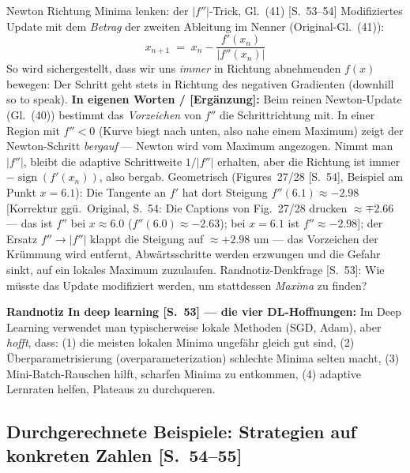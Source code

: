 \begin{satzbox}{Newton Richtung Minima lenken: der $|f''|$-Trick, Gl.~(41) [S.~53--54]}
Modifiziertes Update mit dem \emph{Betrag} der zweiten Ableitung im Nenner
(Original-Gl.~(41)):
\[
  x_{n+1} \;=\; x_n - \frac{f'(x_n)}{\bigl|f''(x_n)\bigr|} \tag{41}
\]
So wird sichergestellt, dass wir uns \emph{immer} in Richtung abnehmenden $f(x)$
bewegen: Der Schritt geht stets in Richtung des negativen Gradienten
(\glqq downhill so to speak\grqq).
\textbf{In eigenen Worten / [Ergänzung]:} Beim reinen Newton-Update (Gl.~(40))
bestimmt das \emph{Vorzeichen} von $f''$ die Schrittrichtung mit. In einer Region mit
$f'' < 0$ (Kurve biegt nach unten, also nahe einem Maximum) zeigt der Newton-Schritt
\emph{bergauf} --- Newton wird vom Maximum angezogen. Nimmt man $|f''|$, bleibt die
adaptive Schrittweite $1/|f''|$ erhalten, aber die Richtung ist immer
$-\operatorname{sign}(f'(x_n))$, also bergab. Geometrisch (Figures~27/28 [S.~54],
Beispiel am Punkt $x = 6.1$): Die Tangente an $f'$ hat dort Steigung $f''(6.1) \approx -2.98$
[Korrektur ggü.\ Original, S.~54: Die Captions von Fig.~27/28 drucken $\approx \mp 2.66$ ---
das ist $f''$ bei $x \approx 6.0$ ($f''(6.0) \approx -2.63$); bei $x = 6.1$ ist
$f'' \approx -2.98$]; der Ersatz $f'' \to |f''|$ klappt die Steigung auf $\approx +2.98$ um --- das
Vorzeichen der Krümmung wird entfernt, Abwärtsschritte werden erzwungen und die Gefahr
sinkt, auf ein lokales Maximum zuzulaufen. Randnotiz-Denkfrage [S.~53]: Wie müsste das
Update modifiziert werden, um stattdessen \emph{Maxima} zu finden?

\medskip
\textbf{Randnotiz \glqq In deep learning\grqq{} [S.~53] --- die vier DL-Hoffnungen:}
Im Deep Learning verwendet man typischerweise lokale Methoden (SGD, Adam), aber
\emph{hofft}, dass: (1) die meisten lokalen Minima ungefähr gleich gut sind,
(2) Überparametrisierung (overparameterization) schlechte Minima selten macht,
(3) Mini-Batch-Rauschen hilft, scharfen Minima zu entkommen,
(4) adaptive Lernraten helfen, Plateaus zu durchqueren.
\end{satzbox}

\subsection{Durchgerechnete Beispiele: Strategien auf konkreten Zahlen [S.~54--55]}

